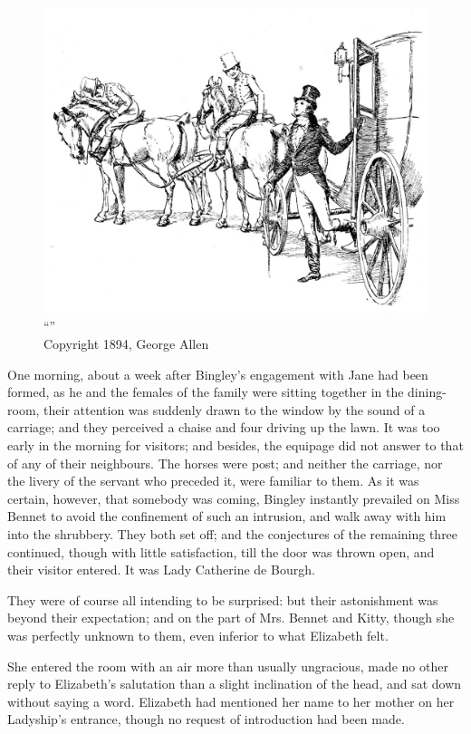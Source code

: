 \begin{figure}[htbp]
    \centering
    \includegraphics[width=\textwidth]{illustrations/i_031.jpg}
    \caption{“”\\ Copyright 1894, George Allen}
    \label{fig:image}
\end{figure}


One morning, about a week after Bingley's engagement with Jane had been formed, as he and the females of the family were sitting together in the dining-room, their attention was suddenly drawn to the window by the sound of a carriage; and they perceived a chaise and four driving up the lawn. It was too early in the morning for visitors; and besides, the equipage did not answer to that of any of their neighbours. The horses were post; and neither the carriage, nor the livery of the servant who preceded it, were familiar to them. As it was certain, however, that somebody was coming, Bingley instantly prevailed on Miss Bennet to avoid the confinement of such an intrusion, and walk away with him into the shrubbery. They both set off; and the conjectures of the remaining three continued, though with little satisfaction, till the door was thrown open, and their visitor entered. It was Lady Catherine de Bourgh.

They were of course all intending to be surprised: but their astonishment was beyond their expectation; and on the part of Mrs. Bennet and Kitty, though she was perfectly unknown to them, even inferior to what Elizabeth felt.

She entered the room with an air more than usually ungracious, made no other reply to Elizabeth's salutation than a slight inclination of the head, and sat down without saying a word. Elizabeth had mentioned her name to her mother on her Ladyship's entrance, though no request of introduction had been made.

